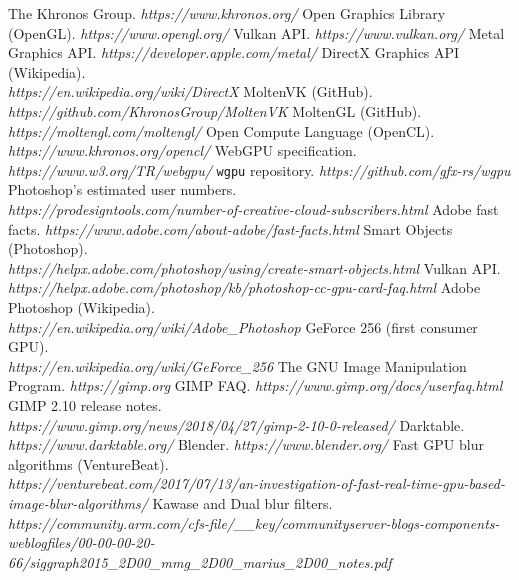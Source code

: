 \documentclass[12pt]{article}
\begin{document}
\pagebreak

\begin{thebibliography}{99}

     The Khronos Group. \emph{https://www.khronos.org/}
     Open Graphics Library (OpenGL). \emph{https://www.opengl.org/}
     Vulkan API. \emph{https://www.vulkan.org/}
     Metal Graphics API. \emph{https://developer.apple.com/metal/}
     DirectX Graphics API (Wikipedia). \\
        \emph{https://en.wikipedia.org/wiki/DirectX}
     MoltenVK (GitHub). \emph{https://github.com/KhronosGroup/MoltenVK}
     MoltenGL (GitHub). \emph{https://moltengl.com/moltengl/}
     Open Compute Language (OpenCL). \emph{https://www.khronos.org/opencl/}
     WebGPU specification. \emph{https://www.w3.org/TR/webgpu/}
     \verb|wgpu| repository. \emph{https://github.com/gfx-rs/wgpu}
     Photoshop's estimated user numbers. \\
        \emph{https://prodesigntools.com/number-of-creative-cloud-subscribers.html}
     Adobe fast facts. \emph{https://www.adobe.com/about-adobe/fast-facts.html}
     Smart Objects (Photoshop). \\
        \emph{https://helpx.adobe.com/photoshop/using/create-smart-objects.html}
     Vulkan API. \\
        \emph{https://helpx.adobe.com/photoshop/kb/photoshop-cc-gpu-card-faq.html}
     Adobe Photoshop (Wikipedia). \\
        \emph{https://en.wikipedia.org/wiki/Adobe\_Photoshop}
     GeForce 256 (first consumer GPU). \\
        \emph{https://en.wikipedia.org/wiki/GeForce\_256}
     The GNU Image Manipulation Program. \emph{https://gimp.org}
     GIMP FAQ. \emph{https://www.gimp.org/docs/userfaq.html}
     GIMP 2.10 release notes. \\
        \emph{https://www.gimp.org/news/2018/04/27/gimp-2-10-0-released/}
     Darktable. \emph{https://www.darktable.org/}
     Blender. \emph{https://www.blender.org/}
     Fast GPU blur algorithms (VentureBeat). \\
        \emph{https://venturebeat.com/2017/07/13/an-investigation-of-fast-real-time-gpu-based-image-blur-algorithms/}
     Kawase and Dual blur filters. \\
        \emph{https://community.arm.com/cfs-file/\_\_key/communityserver-blogs-components-weblogfiles/00-00-00-20-66/siggraph2015\_2D00\_mmg\_2D00\_marius\_2D00\_notes.pdf}

\end{thebibliography}
\end{document}
